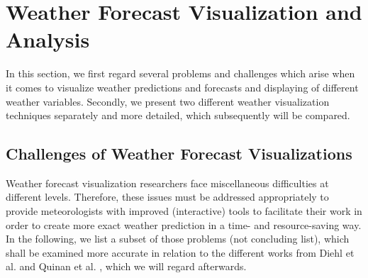 \documentclass[citeauthoryear]{llncs}
\begin{document}
\section{Weather Forecast Visualization and Analysis}
\label{comparison}
In this section, we first regard several problems and challenges which arise when it comes to visualize weather predictions and forecasts and displaying of different weather variables. Secondly, we present two different weather visualization techniques separately and more detailed, which subsequently will be compared.

\subsection{Challenges of Weather Forecast Visualizations}
\label{challenges}
Weather forecast visualization researchers face miscellaneous difficulties at different levels. Therefore, these issues must be addressed appropriately to provide meteorologists with improved (interactive) tools to facilitate their work in order to create more exact weather prediction in a time- and resource-saving way. In the following, we list a subset of those problems (not concluding list), which shall be examined more accurate in relation to the different works from Diehl et al. \cite{diehl2015visual} and Quinan et al. \cite{quinan2016visually}, which we will regard afterwards.
\end{document}

